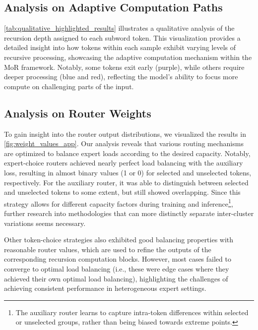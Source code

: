 \subsection{Analysis on Adaptive Computation Paths}


\autoref{tab:qualitative_highlighted_results} illustrates a qualitative analysis of the recursion depth assigned to each subword token. This visualization provides a detailed insight into how tokens within each sample exhibit varying levels of recursive processing, showcasing the adaptive computation mechanism within the MoR framework. Notably, some tokens exit early (purple), while others require deeper processing (blue and red), reflecting the model’s ability to focus more compute on challenging parts of the input.





\clearpage


\subsection{Analysis on Router Weights}

To gain insight into the router output distributions, we visualized the results in \autoref{fig:weight_values_app}. Our analysis reveals that various routing mechanisms are optimized to balance expert loads according to the desired capacity. Notably, expert-choice routers achieved nearly perfect load balancing with the auxiliary loss, resulting in almost binary values (1 or 0) for selected and unselected tokens, respectively. 
For the auxiliary router, it was able to distinguish between selected and unselected tokens to some extent, but still showed overlapping. Since this strategy allows for different capacity factors during training and inference\footnote{The auxiliary router learns to capture intra-token differences within selected or unselected groups, rather than being biased towards extreme points.}, further research into methodologies that can more distinctly separate inter-cluster variations seems necessary.

Other token-choice strategies also exhibited good balancing properties with reasonable router values, which are used to refine the outputs of the corresponding recursion computation blocks. However, most cases failed to converge to optimal load balancing (i.e., these were edge cases where they achieved their own optimal load balancing), highlighting the challenges of achieving consistent performance in heterogeneous expert settings.




